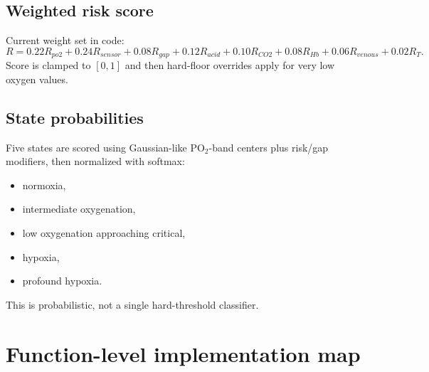 \documentclass[12pt,a4paper]{article}
\begin{document}
\subsection{Weighted risk score}
Current weight set in code:
\[
R = 0.22R_{po2} + 0.24R_{sensor} + 0.08R_{gap} + 0.12R_{acid} + 0.10R_{CO2} + 0.08R_{Hb} + 0.06R_{venous} + 0.02R_T.
\]
Score is clamped to $[0,1]$ and then hard-floor overrides apply for very low oxygen values.

\subsection{State probabilities}
Five states are scored using Gaussian-like PO$_2$-band centers plus risk/gap modifiers, then normalized with softmax:
\begin{itemize}
    \item normoxia,
    \item intermediate oxygenation,
    \item low oxygenation approaching critical,
    \item hypoxia,
    \item profound hypoxia.
\end{itemize}

This is probabilistic, not a single hard-threshold classifier.

\section{Function-level implementation map}
\end{document}
